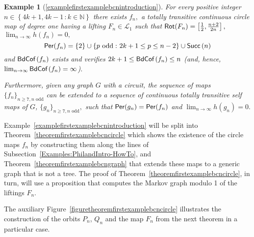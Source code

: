 \documentclass[a4paper, 11pt]{amsart}
\numberwithin{equation}{section}
\theoremstyle{customnumberedtheorem}
\newtheorem{CustomNumberedExample}{Example}
\theoremstyle{definitionwithbfnote}
\newcommand{\N}{\ensuremath{\mathbb{N}}}
\DeclareMathOperator{\bc}{\textsf{\upshape BdCof\,}}
\DeclareMathOperator{\Per}{\textsf{\upshape Per}}
\DeclareMathOperator{\Rot}{\textsf{\upshape Rot}}
\DeclareMathOperator{\Succ}{\textsf{\upshape Succ}}
\newcommand{\dol}[1][1]{\ensuremath{\mathcal{L}_{#1}}}
\newcommand{\succs}[1]{\ensuremath{\Succ\left(#1\right)}}
\newcommand{\set}[2]{\ensuremath{\left\{#1 \,\colon #2\right\}}}
\begin{document}
\begin{CustomNumberedExample}[\ref{examplefirstexamplebcnintroduction}]
For every positive integer $n \in \set{4k+1, 4k-1}{k\in \N}$
there exists $f_n,$ a totally transitive continuous circle map
of degree one having a lifting $F_n \in \dol$ such that
$\Rot(F_n) = \left[\tfrac{1}{2}, \tfrac{n+2}{2n}\right],$
$\lim_{n\to\infty} h(f_n) = 0,$
\[
  \Per (f_n) = \{ 2\} \cup \set{p\ \text{odd}}{2k+1 \le p\le n-2} \cup  \succs{n}
\]
and $\bc(f_n)$ exists and verifies $2k+1 \le \bc(f_n) \le n$
(and, hence, $\lim_{n\to\infty} \bc(f_n) = \infty$).\smallskip

Furthermore, given any graph $G$ with a circuit, the sequence of maps
$\{f_n\}_{n\ge 7, n\text{ odd}}$ can be extended to a sequence
of continuous totally transitive self maps of $G$,
$\{g_n\}_{n\ge 7, n\text{ odd}},$
such that
$\Per(g_n) = \Per(f_n)$ and $\lim_{n\to\infty} h(g_n) = 0.$
\end{CustomNumberedExample}

Example~\ref{examplefirstexamplebcnintroduction} will be split
into Theorem~\ref{theoremfirstexamplebcncircle}
which shows the existence of the circle maps $f_n$ by constructing them
along the lines of Subsection~\ref{Examples:PhilandIntro-HowTo},
and Theorem~\ref{theoremfirstexamplebcngraph} that
extends these maps to a generic graph that is not a tree.
The proof of Theorem~\ref{theoremfirstexamplebcncircle}, in turn, will
use a proposition that computes the Markov graph modulo 1 of the
liftings $F_n.$

The auxiliary Figure~\ref{figuretheoremfirstexamplebcncircle}
illustrates the construction of the orbits $P_n$, $Q_n$ and
the map $F_n$ from the next theorem in a particular case.
\end{document}
